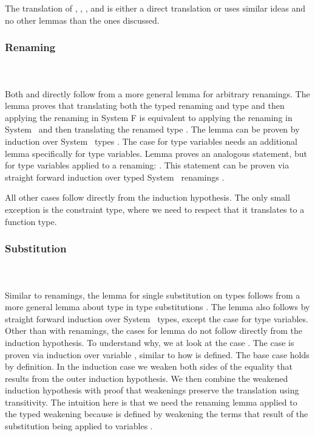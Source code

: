 \noindent The translation of , , ,  and  is either a direct translation or uses similar ideas and no other lemmas than the ones discussed.

\subsubsection{Renaming}\hfill\\\\
Both  and  directly follow from a more general lemma  for arbitrary renamings. 
The lemma  proves that translating both the typed renaming  and type  and then applying the renaming in System F is equivalent to applying the renaming  in System \Fo\ and then translating the renamed type . 
The lemma can be proven by induction over System \Fo\ types .
\DPTTypePresRen
The case for type variables needs an additional lemma  specifically for type variables.
Lemma  proves an analogous statement, but for type variables applied to a renaming: \DPTVarPresRen. 
This statement can be proven via straight forward induction over typed System \Fo\ renamings .

\noindent All other cases follow directly from the induction hypothesis. 
The only small exception is the constraint type, where we need to respect that it translates to a function type.

\subsubsection{Substitution}\hfill\\\\
Similar to renamings, the lemma for single substitution on types  follows from a more general lemma about type in type substitutions .
The lemma  also follows by straight forward induction over System \Fo\ types, except the case for type variables. 
Other than with renamings, the cases for lemma  do not follow directly from the induction hypothesis. 
To understand why, we at look at the case .
\DPTVarPresSub
The case  is proven via induction over variable , similar to how  is defined. 
The base case holds by definition. 
In the induction case we weaken both sides of the equality that results from the outer induction hypothesis. 
We then combine the weakened induction hypothesis with proof that weakenings preserve the translation using transitivity. 
The intuition here is that we need the renaming lemma  applied to the typed weakening  because  is defined by weakening the terms that result of the substitution  being applied to variables .

